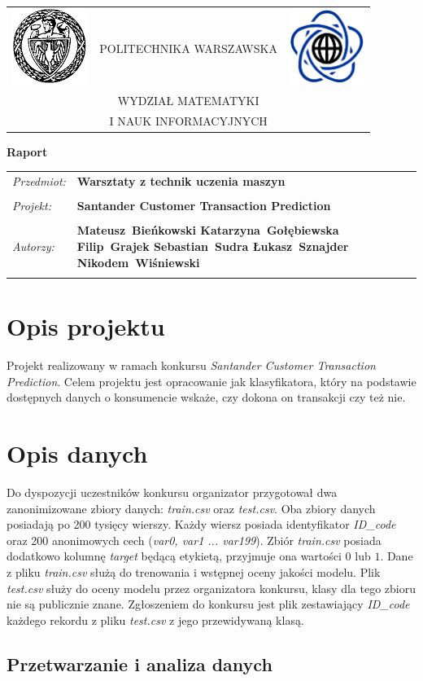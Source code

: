 ﻿\documentclass[12pt]{article}
\renewcommand{\maketitle}{
\begin{titlepage}
\begin{table}[t]
\centering
\begin{tabular}[t]{lcr}
 \includegraphics[width=70pt,height=70pt]{PW} & POLITECHNIKA WARSZAWSKA & \includegraphics[width=70pt,height=70pt]{MiNI}\\
& WYDZIAŁ MATEMATYKI & \\
& I NAUK INFORMACYJNYCH &
\end{tabular}
\end{table}
\vspace*{3cm}
  \begin{center}
    \LARGE
    \textbf {Raport}\\
   \vspace*{2 cm}
\begin{table}[!htp]
\begin{tabular}{p{4cm}p{10cm}}
\textit{Przedmiot:} &\textbf {Warsztaty z technik uczenia maszyn} \\
\\
\textit{Projekt:} &\textbf {Santander Customer Transaction Prediction} \\
\\
\textit{Autorzy:} &\textbf {Mateusz~Bieńkowski \newline
	Katarzyna~Gołębiewska \newline
	Filip~Grajek \newline
	Sebastian~Sudra \newline
	Łukasz~Sznajder \newline
	Nikodem~Wiśniewski \newline 
 } \\
\\
\end{tabular}
\end{table}

\vspace{5 cm}
  \center{\small Warszawa, dnia \today}
\end{center}
\end{titlepage}
}
\begin{document}
\maketitle

\newpage

\section{Opis projektu}

Projekt realizowany w ramach konkursu \textit{Santander Customer Transaction Prediction}\cite{santanderkaggle}. Celem projektu jest opracowanie jak klasyfikatora, który na podstawie dostępnych danych o konsumencie wskaże, czy dokona on transakcji czy też nie. 

\section{Opis danych}

Do dyspozycji uczestników konkursu organizator przygotował dwa zanonimizowane zbiory danych: \textit{train.csv} oraz \textit{test.csv}. Oba zbiory danych posiadają po 200 tysięcy wierszy. Każdy wiersz posiada identyfikator \textit{ID\_code} oraz 200 anonimowych cech (\textit{var0, var1 ... var199}). Zbiór \textit{train.csv} posiada dodatkowo kolumnę \textit{target} będącą etykietą, przyjmuje ona wartości $0$ lub $1$. Dane z pliku \textit{train.csv} służą do trenowania i wstępnej oceny jakości modelu. Plik \textit{test.csv} służy do oceny modelu przez organizatora konkursu, klasy dla tego zbioru nie są publicznie znane. Zgłoszeniem do konkursu jest plik zestawiający \textit{ID\_code} każdego rekordu z pliku \textit{test.csv} z jego przewidywaną klasą.


\subsection{Przetwarzanie i analiza danych}
\end{document}

